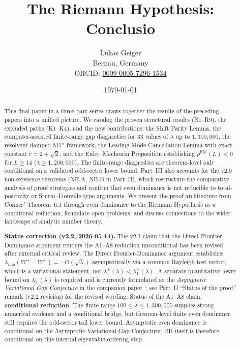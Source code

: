 \documentclass[12pt,a4paper]{article}
\title{The Riemann Hypothesis: Conclusio}
\author{Lukas Geiger\\
\small Bernau, Germany\\
\small ORCID: \href{https://orcid.org/0009-0005-7296-1534}{0009-0005-7296-1534}}
\date{\today}
\theoremstyle{definition}
\theoremstyle{remark}
\begin{document}
\overfullrule=0pt
\maketitle

\begin{abstract}\footnotesize
This final paper in a three-part series draws together the results of the preceding papers into a unified picture. We catalog the proven structural results (R1--R9), the excluded paths (K1--K4), and the new contributions: the Shift Parity Lemma, the computer-assisted finite-range gap diagnostics for $33$ values of $\lambda$ up to $1{,}300{,}000$, the resolvent-damped M1$''$ framework, the Leading-Mode Cancellation Lemma with exact constant $c = 2 + \sqrt{2}$, and the Euler--Maclaurin Proposition establishing $\rho^{\mathrm{EM}}(L) < 0$ for $L \geq 14$ ($\lambda \geq 1{,}200{,}000$). The finite-range diagnostics are theorem-level only conditional on a validated odd-sector lower bound. Part~III also accounts for the v2.0 non-existence theorems (NE-A, NE-B in Part~II), which restructure the comparative analysis of proof strategies and confirm that even dominance is not reducible to total-positivity or Sturm--Liouville-type arguments. We present the proof architecture from Connes' Theorem~6.1 through even dominance to the Riemann Hypothesis as a conditional reduction, formulate open problems, and discuss connections to the wider landscape of analytic number theory.

\medskip\noindent
\textbf{Status correction (v2.2, 2026-05-14).}
The v2.1 claim that the Direct Frontier-Dominance argument renders the
A1--A8 reduction unconditional has been revised after external critical
review.  The Direct Frontier-Dominance argument establishes
$\lambda_{\min}(W^+-W^-)=-\Theta(\sqrt\lambda)$ asymptotically via a
common Rayleigh test vector, which is a variational statement, not
$\lambda_1^+(\lambda)<\lambda_1^-(\lambda)$.  A separate quantitative
lower bound on $\lambda_1^-(\lambda)$ is required and is currently
formulated as the \emph{Asymptotic Variational Gap Conjecture} in the
companion paper~\cite{Geiger2026evendom}; see Part~II ``Status of the
proof'' remark (v2.2 revision) for the revised wording.  Status of the
A1--A8 chain: \textbf{conditional reduction}.  The finite range
$100 \le \lambda \le 1{,}300{,}000$ supplies strong numerical evidence and a
conditional bridge, but theorem-level finite even dominance still requires
the odd-sector tail lower bound.  Asymptotic even dominance is conditional on
the Asymptotic Variational Gap Conjecture; RH itself is therefore conditional
on this internal eigenvalue-ordering step.


\end{abstract}
\end{document}
